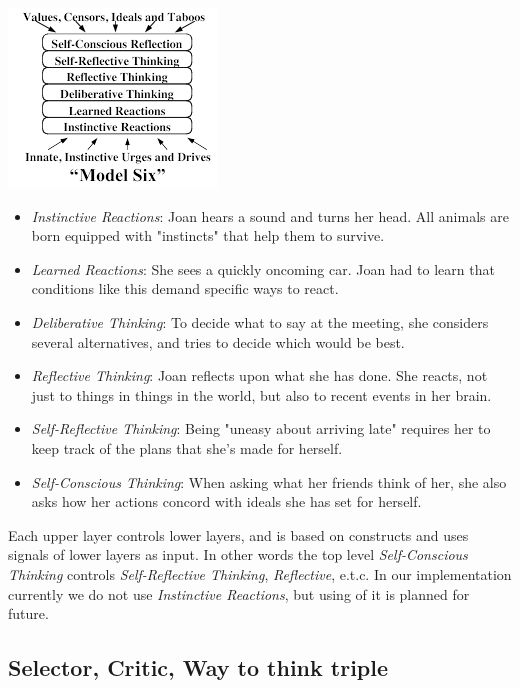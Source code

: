 \documentclass[conference]{IEEEtran}
\begin{document}
\includegraphics[scale=0.9]{model_6.png}

\begin{itemize}
 \item \emph{Instinctive Reactions}:  Joan hears a sound and turns her head. All animals are born equipped with "instincts" that help them to survive.
 \item \emph{Learned Reactions}: She sees a quickly oncoming car. Joan had to learn that conditions like this demand specific ways to react.
 \item \emph{Deliberative Thinking}: To decide what to say at the meeting, she considers several alternatives, and tries to decide which would be best.
 \item \emph{Reflective Thinking}: Joan reflects upon what she has done. She reacts, not just to things in things in the world, but also to recent events in her brain.
 \item \emph{Self-Reflective Thinking}: Being "uneasy about arriving late" requires her to keep track of the plans that she's made for herself.
 \item \emph{Self-Conscious Thinking}: When asking what her friends think of her, she also asks how her actions concord with ideals she has set for herself.
\end{itemize}

Each upper layer controls lower layers, and is based on constructs and uses signals of lower layers as input. In other words the top level \emph{Self-Conscious Thinking} controls \emph{Self-Reflective Thinking}, \emph{Reflective}, e.t.c. 
In our implementation currently we do not use \emph{Instinctive Reactions}, but using of it is planned for future.

\subsection{Selector, Critic, Way to think triple}
\end{document}
